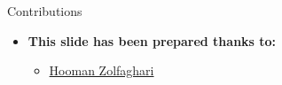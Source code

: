 \documentclass[serif, aspectratio=169]{beamer}
\begin{document}

\begin{frame}{Contributions}
\begin{itemize}
\item \textbf{This slide has been prepared thanks to:}
\begin{itemize}
\item \href{https://hoomanzolfaghari84.github.io/}{Hooman Zolfaghari}
\end{itemize}
\end{itemize}

\end{frame}

\begin{frame}[allowframebreaks]
    
    
    \nocite{*}
\end{frame}
\end{document}
